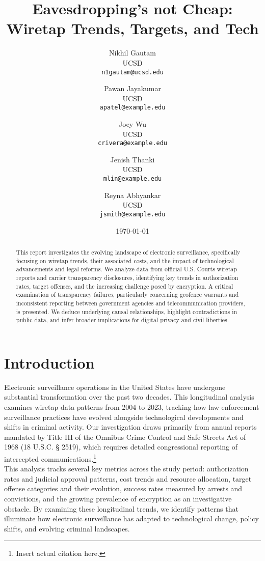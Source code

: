\documentclass[11pt,twocolumn]{article} %
\title{\textbf{Eavesdropping's not Cheap: Wiretap Trends, Targets, and Tech} \\
\large }
\author{
Nikhil Gautam \\
UCSD \\
\texttt{n1gautam@ucsd.edu}
\and
Pawan Jayakumar \\
UCSD \\
\texttt{apatel@example.edu}
\and
Joey Wu \\
UCSD \\
\texttt{crivera@example.edu}
\and
Jenish Thanki \\
UCSD \\
\texttt{mlin@example.edu}
\and
Reyna Abhyankar\\
UCSD\\
\texttt{jsmith@example.edu}
}
\date{\today}
\begin{document}
\maketitle

\begin{abstract}
\noindent This report investigates the evolving landscape of electronic surveillance, specifically focusing on wiretap trends, their associated costs, and the impact of technological advancements and legal reforms. We analyze data from official U.S. Courts wiretap reports and carrier transparency disclosures, identifying key trends in authorization rates, target offenses, and the increasing challenge posed by encryption. A critical examination of transparency failures, particularly concerning geofence warrants and inconsistent reporting between government agencies and telecommunication providers, is presented. We deduce underlying causal relationships, highlight contradictions in public data, and infer broader implications for digital privacy and civil liberties.
\end{abstract}

\section{Introduction}
\label{sec:introduction}
\noindent Electronic surveillance operations in the United States have undergone substantial transformation over the past two decades. This longitudinal analysis examines wiretap data patterns from 2004 to 2023, tracking how law enforcement surveillance practices have evolved alongside technological developments and shifts in criminal activity. Our investigation draws primarily from annual reports mandated by Title III of the Omnibus Crime Control and Safe Streets Act of 1968 (18 U.S.C. § 2519), which requires detailed congressional reporting of intercepted communications.\footnote{Insert actual citation here.}\\

\noindent This analysis tracks several key metrics across the study period: authorization rates and judicial approval patterns, cost trends and resource allocation, target offense categories and their evolution, success rates measured by arrests and convictions, and the growing prevalence of encryption as an investigative obstacle. By examining these longitudinal trends, we identify patterns that illuminate how electronic surveillance has adapted to technological change, policy shifts, and evolving criminal landscapes.\\
\end{document}

